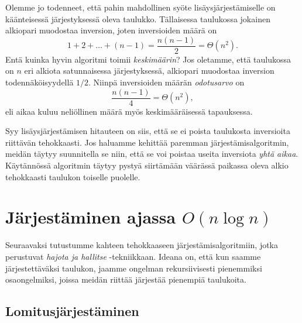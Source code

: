 Olemme jo todenneet, että pahin mahdollinen syöte
lisäysjärjestämiselle on käänteisessä järjestyksessä oleva taulukko.
Tällaisessa taulukossa jokainen alkiopari muodostaa inversion,
joten inversioiden määrä on
\[1+2+\dots+(n-1)=\frac{n(n-1)}{2}=\Theta(n^2).\]
Entä kuinka hyvin algoritmi toimii \emph{keskimäärin}?
Jos oletamme, että taulukossa on $n$ eri alkiota satunnaisessa
järjestyksessä, alkiopari muodostaa inversion todennäköisyydellä $1/2$.
Niinpä inversioiden määrän \emph{odotusarvo} on
\[\frac{n(n-1)}{4}=\Theta(n^2),\]
eli aikaa kuluu neliöllinen määrä myös keskimääräisessä
tapauksessa.

Syy lisäysjärjestämisen hitauteen on siis,
että se ei poista taulukosta inversioita riittävän tehokkaasti.
Jos haluamme kehittää paremman järjestämis\-algoritmin,
meidän täytyy suunnitella se niin, että se voi poistaa
useita inversiota \emph{yhtä aikaa}.
Käytännössä algoritmin täytyy pystyä siirtämään
väärässä paikassa oleva alkio tehokkaasti taulukon
toiselle puolelle.

\section{Järjestäminen ajassa $O(n \log n)$}

Seuraavaksi tutustumme kahteen tehokkaaseen
järjestämisalgoritmiin, jotka perustuvat
\emph{hajota ja hallitse} -tekniikkaan.
Ideana on, että kun saamme järjestettäväksi taulukon,
jaamme ongelman rekursiivisesti pienemmiksi osa\-ongelmiksi,
joissa meidän riittää järjestää pienempiä taulukoita.

\subsection{Lomitusjärjestäminen}

